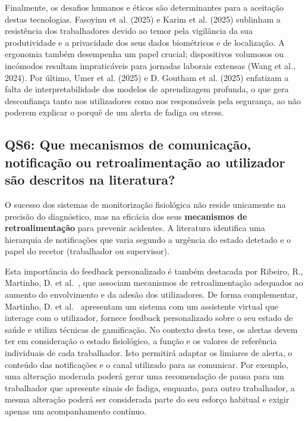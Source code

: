 Finalmente, os desafios humanos e éticos são determinantes para a aceitação destas tecnologias. Fasoyinu et al. (2025) e Karim et al. (2025)\cite{fasoyinu2025,karim2025} sublinham a resistência dos trabalhadores devido ao temor pela vigilância da sua produtividade e a privacidade dos seus dados biométricos e de localização. A ergonomia também desempenha um papel crucial; dispositivos volumosos ou incómodos resultam impraticáveis para jornadas laborais extensas (Wang et al., 2024)\cite{wang2024}. Por último, Umer et al. (2025) e D. Goutham et al. (2025)\cite{umer2025,goutham2025} enfatizam a falta de interpretabilidade dos modelos de aprendizagem profunda, o que gera desconfiança tanto nos utilizadores como nos responsáveis pela segurança, ao não poderem explicar o porquê de um alerta de fadiga ou stress.

\subsection*{QS6: Que mecanismos de comunicação, notificação ou retroalimentação ao utilizador são descritos na literatura?}
\label{subsec:qs6}

O sucesso dos sistemas de monitorização fisiológica não reside unicamente na precisão do diagnóstico, mas na eficácia dos seus \textbf{mecanismos de retroalimentação} para prevenir acidentes. A literatura identifica uma hierarquia de notificações que varia segundo a urgência do estado detetado e o papel do recetor (trabalhador ou supervisor).

Esta importância do feedback personalizado é também destacada por Ribeiro, R., Martinho, D. et al.~\cite{ribeiro2026wearable}, que associam mecanismos de retroalimentação adequados ao aumento do envolvimento e da adesão dos utilizadores. De forma complementar, Martinho, D. et al.~\cite{martinho2023elderlycare} apresentam um sistema com um assistente virtual que interage com o utilizador, fornece feedback personalizado sobre o seu estado de saúde e utiliza técnicas de gamificação. No contexto desta tese, os alertas devem ter em consideração o estado fisiológico, a função e os valores de referência individuais de cada trabalhador. Isto permitirá adaptar os limiares de alerta, o conteúdo das notificações e o canal utilizado para as comunicar. Por exemplo, uma alteração moderada poderá gerar uma recomendação de pausa para um trabalhador que apresente sinais de fadiga, enquanto, para outro trabalhador, a mesma alteração poderá ser considerada parte do seu esforço habitual e exigir apenas um acompanhamento contínuo.

